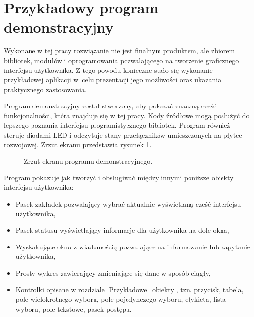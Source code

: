 
\rozdzial


\section{Przykładowy program demonstracyjny}
\label{roz_przyklady}

Wykonane w tej pracy rozwiązanie nie jest finalnym produktem, ale zbiorem bibliotek, modułów i oprogramowania pozwalającego na tworzenie graficznego interfejsu użytkownika. Z tego powodu konieczne stało się wykonanie przykładowej aplikacji w~celu prezentacji jego możliwości oraz ukazania praktycznego zastosowania.

Program demonstracyjny został stworzony, aby pokazać znaczną cześć funkcjonalności, która znajduje się w tej pracy. Kody źródłowe mogą posłużyć do lepszego poznania interfejsu programistycznego bibliotek. Program również steruje diodami LED i odczytuje stany przełączników umieszczonych na płytce rozwojowej. Zrzut ekranu przedstawia rysunek \ref{demoScreen}.



\begin{figure}[h]	
	\centering
	\caption{ Zrzut ekranu programu demonstracyjnego. }
	\label{demoScreen}
\end{figure}


Program pokazuje jak tworzyć i obsługiwać między innymi poniższe obiekty interfejsu użytkownika:
\begin{itemize}
	\item Pasek zakładek pozwalający wybrać aktualnie wyświetlaną cześć interfejsu użytkownika,
	\item Pasek statusu wyświetlający informacje dla użytkownika na dole okna,
	\item Wyskakujące okno z wiadomością pozwalające na informowanie lub zapytanie użytkownika,
	\item Prosty wykres zawierający zmieniające się dane w sposób ciągły,
	\item Kontrolki opisane w rozdziale \ref{Przykladowe_obiekty}, tzn. przycisk, tabela, pole wielokrotnego wyboru, pole pojedynczego wyboru, etykieta, lista wyboru, pole tekstowe, pasek postępu.
\end{itemize}


